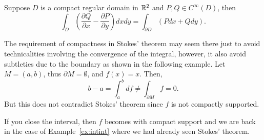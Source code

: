 \begin{corollary}
	Suppose $D$ is a compact regular domain in $\mathbb{R}^2$ and $P,Q\in C^\infty(D)$, then
	\begin{equation}
		\int_D \left(\frac{\partial Q}{\partial x} - \frac{\partial P}{\partial y}\right)dxdy = \int_{\partial D}(Pdx + Qdy).
	\end{equation}
\end{corollary}

\begin{remark}
	The requirement of compactness in Stokes' theorem may seem there just to avoid technicalities involving the convergence of the integral, however, it also avoid subtleties due to the boundary as shown in the following example.
	Let $M=(a,b)$, thus $\partial M = \emptyset$, and $f(x)=x$.
	Then,
	\begin{equation}
		b-a = \int_a^b df \neq \int_{\partial M} f = 0.
	\end{equation}
	But this does not contradict Stokes' theorem since $f$ is not compactly supported.

	If you close the interval, then $f$ becomes with compact support and we are back in the case of Example~\ref{ex:intint} where we had already seen Stokes' theorem.
\end{remark}

